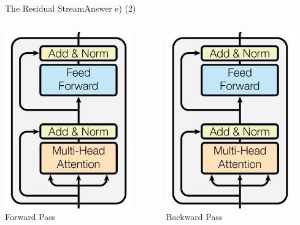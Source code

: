 \documentclass[t]{beamer}
\begin{document}
\begin{frame}{The Residual Stream}{Answer e) (2)}
    \begin{columns}
        \begin{column}{0.5\textwidth}
            \begin{center}
                \includegraphics[scale=0.4]{img/transformer_layer.png}
                \\ \vspace{1cm}Forward Pass
            \end{center}
        \end{column}
        \begin{column}{0.5\textwidth}
            \begin{center}
                \includegraphics[scale=0.4]{img/transformer_layer.png}
                \\ \vspace{1cm}Backward Pass
            \end{center}
        \end{column}
    \end{columns}
\end{frame}
\end{document}
